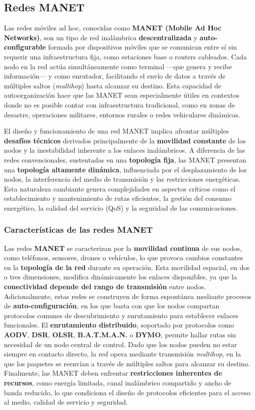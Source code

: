 \documentclass{article}
\begin{document}
\subsection{Redes MANET}
Las redes móviles ad hoc, conocidas como \textbf{MANET (Mobile Ad Hoc Networks)}, son un tipo de red inalámbrica \textbf{descentralizada} y \textbf{auto-configurable} formada por dispositivos móviles que se comunican entre sí sin requerir una infraestructura fija, como estaciones base o routers cableados. Cada nodo en la red actúa simultáneamente como terminal —que genera y recibe información— y como enrutador, facilitando el envío de datos a través de múltiples saltos (\textit{multihop}) hasta alcanzar su destino. Esta capacidad de autoorganización hace que las MANET sean especialmente útiles en contextos donde no es posible contar con infraestructura tradicional, como en zonas de desastre, operaciones militares, entornos rurales o redes vehiculares dinámicas.

El diseño y funcionamiento de una red MANET implica afrontar múltiples \textbf{desafíos técnicos} derivados principalmente de la \textbf{movilidad constante} de los nodos y la inestabilidad inherente a los enlaces inalámbricos. A diferencia de las redes convencionales, sustentadas en una \textbf{topología fija}, las MANET presentan una \textbf{topología altamente dinámica}, influenciada por el desplazamiento de los nodos, la interferencia del medio de transmisión y las restricciones energéticas. Esta naturaleza cambiante genera complejidades en aspectos críticos como el establecimiento y mantenimiento de rutas eficientes, la gestión del consumo energético, la calidad del servicio (QoS) y la seguridad de las comunicaciones.


\subsubsection{Características de las redes MANET}
Las redes \textbf{MANET} se caracterizan por la \textbf{movilidad continua} de sus nodos, como teléfonos, sensores, drones o vehículos, lo que provoca cambios constantes en la \textbf{topología de la red} durante su operación. Esta movilidad espacial, en dos o tres dimensiones, modifica dinámicamente los enlaces disponibles, ya que la \textbf{conectividad depende del rango de transmisión} entre nodos. Adicionalmente, estas redes se construyen de forma espontánea mediante procesos de \textbf{auto-configuración}, en los que basta con que los nodos compartan protocolos comunes de descubrimiento y enrutamiento para establecer enlaces funcionales. El \textbf{enrutamiento distribuido}, soportado por protocolos como \textbf{AODV}, \textbf{DSR}, \textbf{OLSR}, \textbf{B.A.T.M.A.N.} o \textbf{DYMO}, permite hallar rutas sin necesidad de un nodo central de control. Dado que los nodos pueden no estar siempre en contacto directo, la red opera mediante transmisión \textit{multihop}, en la que los paquetes se reenvían a través de múltiples saltos para alcanzar su destino. Finalmente, las MANET deben enfrentar \textbf{restricciones inherentes de recursos}, como energía limitada, canal inalámbrico compartido y ancho de banda reducido, lo que condiciona el diseño de protocolos eficientes para el acceso al medio, calidad de servicio y seguridad.
\end{document}
